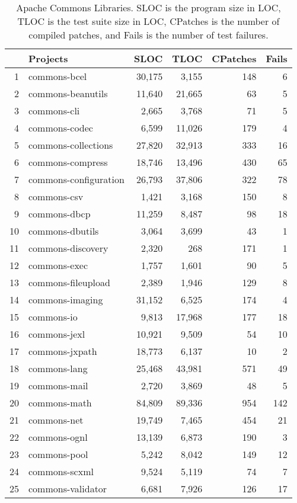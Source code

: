 \documentclass[preprint,nonatbib]{sigplanconf}\usepackage[]{graphicx}\usepackage[]{color}
\begin{document}
\begin{table}
\centering
\begin{tabular}{|r|l|r|r|r|r|}
  \hline
 & Projects & SLOC & TLOC & CPatches & Fails \\ 
  \hline
1 & commons-bcel & 30,175 & 3,155 & 148 &   6 \\ 
  2 & commons-beanutils & 11,640 & 21,665 &  63 &   5 \\ 
  3 & commons-cli & 2,665 & 3,768 &  71 &   5 \\ 
  4 & commons-codec & 6,599 & 11,026 & 179 &   4 \\ 
  5 & commons-collections & 27,820 & 32,913 & 333 &  16 \\ 
  6 & commons-compress & 18,746 & 13,496 & 430 &  65 \\ 
  7 & commons-configuration & 26,793 & 37,806 & 322 &  78 \\ 
  8 & commons-csv & 1,421 & 3,168 & 150 &   8 \\ 
  9 & commons-dbcp & 11,259 & 8,487 &  98 &  18 \\ 
  10 & commons-dbutils & 3,064 & 3,699 &  43 &   1 \\ 
  11 & commons-discovery & 2,320 & 268 & 171 &   1 \\ 
  12 & commons-exec & 1,757 & 1,601 &  90 &   5 \\ 
  13 & commons-fileupload & 2,389 & 1,946 & 129 &   8 \\ 
  14 & commons-imaging & 31,152 & 6,525 & 174 &   4 \\ 
  15 & commons-io & 9,813 & 17,968 & 177 &  18 \\ 
  16 & commons-jexl & 10,921 & 9,509 &  54 &  10 \\ 
  17 & commons-jxpath & 18,773 & 6,137 &  10 &   2 \\ 
  18 & commons-lang & 25,468 & 43,981 & 571 &  49 \\ 
  19 & commons-mail & 2,720 & 3,869 &  48 &   5 \\ 
  20 & commons-math & 84,809 & 89,336 & 954 & 142 \\ 
  21 & commons-net & 19,749 & 7,465 & 454 &  21 \\ 
  22 & commons-ognl & 13,139 & 6,873 & 190 &   3 \\ 
  23 & commons-pool & 5,242 & 8,042 & 149 &  12 \\ 
  24 & commons-scxml & 9,524 & 5,119 &  74 &   7 \\ 
  25 & commons-validator & 6,681 & 7,926 & 126 &  17 \\ 
   \hline
\end{tabular}

\caption{Apache Commons Libraries. SLOC is the program size in LOC, TLOC
is the test suite size in LOC, CPatches is the number of compiled patches,
and Fails is the number of test failures.}
\label{tbl:apache}
\end{table}
\end{document}
